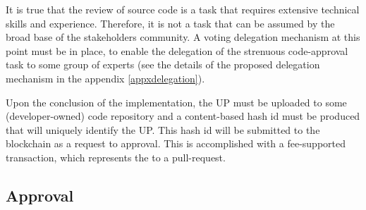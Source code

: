 It is true that the review of source code is a task that requires extensive technical skills and experience. Therefore, it is not a task that can be assumed by the broad base of the stakeholders community. A voting delegation mechanism at this point must be in place, to enable the delegation of the strenuous code-approval task to some group of experts (see the details of the proposed delegation mechanism in the appendix \ref{appxdelegation}). 


Upon the conclusion of the implementation, the UP must be uploaded to some (developer-owned) code repository and a content-based hash id must be produced that will uniquely identify the UP. This hash id will be submitted to the blockchain as a request to approval. This is accomplished with a fee-supported transaction, which represents the  to a pull-request.

\subsection{Approval}


